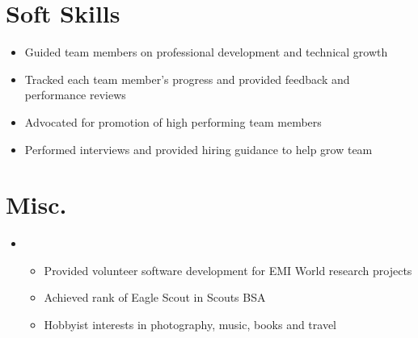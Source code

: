 \documentclass[letterpaper,11pt]{article}
\newcommand{\cvitem}[1]{
  \item\small{
    {#1\vspace{-2pt}}
  }
}
\newcommand{\cvheadingstart}{\begin{itemize}[leftmargin=0in, label={}]}
\newcommand{\cvheadingend}{\end{itemize}}
\newcommand{\cvitemstart}{\begin{itemize}[label=\textopenbullet]\justifying}
\newcommand{\cvitemend}{\end{itemize}\vspace{-5pt}}
\begin{document}
\section{Soft Skills}
\cvitemstart
    \cvitem{Guided team members on professional development and technical growth}
    \cvitem{Tracked each team member's progress and provided feedback and performance reviews}
    \cvitem{Advocated for promotion of high performing team members}
    \cvitem{Performed interviews and provided hiring guidance to help grow team}
\cvitemend

\section{Misc.}
\cvheadingstart
\item
\cvitemstart
  \cvitem{Provided volunteer software development for EMI World research projects}
  \cvitem{Achieved rank of Eagle Scout in Scouts BSA}
  \cvitem{Hobbyist interests in photography, music, books and travel}
\cvitemend
\cvheadingend
\end{document}
